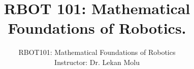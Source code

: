 \documentclass[doublespacing]{brandeis}
\author{RBOT101: Mathematical Foundations of  Robotics \\
	Instructor: Dr. Lekan Molu}
\title{RBOT 101: Mathematical Foundations of  Robotics.
}
\numberwithin{equation}{section}
\theoremstyle{definition}
\begin{document}
	
	\frontmatter
	
	
	\tableofcontents
	\listoffigures %
	\listoftables %
	
	\mainmatter
\newpage
%
%
%
%


%
%
%
%
%
\providecommand\BIBentryALTinterwordstretchfactor{2.5}

%

\end{document}

